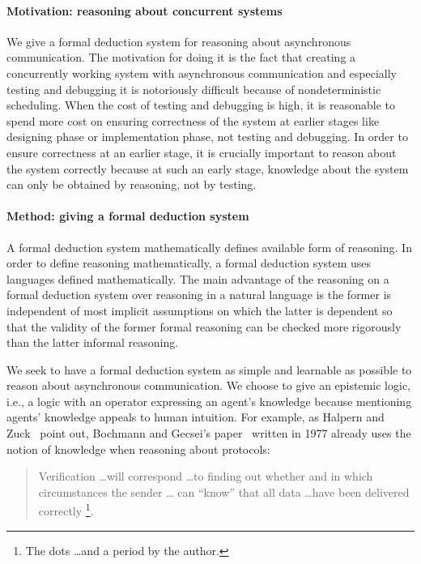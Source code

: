 \documentclass[doctor]{iscs-thesis}
\begin{document}
\paragraph{Motivation: reasoning about concurrent systems}
We give a formal deduction system for reasoning about
asynchronous communication.
The motivation for doing it is
the fact that creating a concurrently
working system with asynchronous communication 
and especially testing and debugging it is
notoriously difficult 
because of nondeterministic scheduling.
When the cost of testing and debugging is high,
it is reasonable to
spend more cost on ensuring correctness of the system
at earlier stages like designing phase or implementation phase, not testing and debugging.
In order to ensure correctness at an earlier stage,
it is crucially important to reason about the system correctly because
at such an early stage, knowledge about the system can only be obtained by reasoning,
not by testing.

\paragraph{Method: giving a formal deduction system}
A formal deduction system mathematically defines
available form of reasoning.
In order to define reasoning mathematically,
a formal deduction system uses languages defined mathematically.
The main advantage of the reasoning on a formal deduction system over
reasoning in a natural language
is the former is independent of most implicit assumptions
on which the latter is dependent so that
the validity of the former formal reasoning can be checked more rigorously
 than the latter informal reasoning.

We seek to have a formal
deduction system as simple and learnable as possible to reason about asynchronous
communication.
We choose to give an epistemic logic, i.e., a logic with an operator expressing an agent's
knowledge because mentioning agents' knowledge appeals to
human intuition.
For example, as Halpern and Zuck~\cite{halpern1992little}
 point out, Bochmann and Gecsei's paper~\cite{bochmann} written in 1977 already uses
 the notion of knowledge when reasoning about protocols:
\begin{quotation}
\noindent
 Verification \ldots will correspond
\ldots to finding out whether and in
which circumstances the sender \ldots
 can ``know'' that all data \ldots have been delivered correctly%
\footnote{The dots \ldots and a period by the author.}.
\end{quotation}
\end{document}
